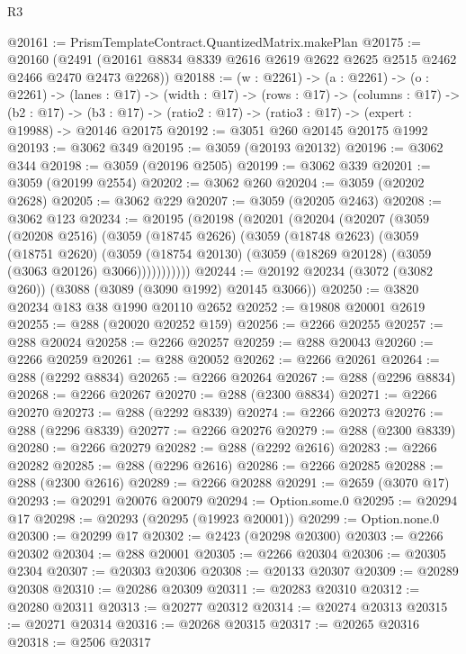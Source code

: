\begin{lexlean}{R3}
\begin{coremodule}
@20161 := PrismTemplateContract.QuantizedMatrix.makePlan
@20175 := @20160
    (@2491 (@20161 @8834 @8339 @2616 @2619 @2622 @2625 @2515 @2462 @2466 @2470 @2473 @2268))
@20188 := (w : @2261) ->
  (a : @2261) ->
  (o : @2261) ->
  (lanes : @17) ->
  (width : @17) ->
  (rows : @17) ->
  (columns : @17) ->
  (b2 : @17) -> (b3 : @17) -> (ratio2 : @17) -> (ratio3 : @17) -> (expert : @19988) -> @20146 @20175
@20192 := @3051 @260 @20145 @20175 @1992
@20193 := @3062 @349
@20195 := @3059 (@20193 @20132)
@20196 := @3062 @344
@20198 := @3059 (@20196 @2505)
@20199 := @3062 @339
@20201 := @3059 (@20199 @2554)
@20202 := @3062 @260
@20204 := @3059 (@20202 @2628)
@20205 := @3062 @229
@20207 := @3059 (@20205 @2463)
@20208 := @3062 @123
@20234 := @20195
    (@20198
      (@20201
        (@20204
          (@20207
            (@3059
              (@20208 @2516)
              (@3059
                (@18745 @2626)
                (@3059
                  (@18748 @2623)
                  (@3059
                    (@18751 @2620)
                    (@3059
                      (@18754 @20130)
                      (@3059 (@18269 @20128) (@3059 (@3063 @20126) @3066)))))))))))
@20244 := @20192 @20234 (@3072 (@3082 @260)) (@3088 (@3089 (@3090 @1992) @20145 @3066))
@20250 := @3820 @20234 @183 @38 @1990 @20110 @2652
@20252 := @19808 @20001 @2619
@20255 := @288 (@20020 @20252 @159)
@20256 := @2266 @20255
@20257 := @288 @20024
@20258 := @2266 @20257
@20259 := @288 @20043
@20260 := @2266 @20259
@20261 := @288 @20052
@20262 := @2266 @20261
@20264 := @288 (@2292 @8834)
@20265 := @2266 @20264
@20267 := @288 (@2296 @8834)
@20268 := @2266 @20267
@20270 := @288 (@2300 @8834)
@20271 := @2266 @20270
@20273 := @288 (@2292 @8339)
@20274 := @2266 @20273
@20276 := @288 (@2296 @8339)
@20277 := @2266 @20276
@20279 := @288 (@2300 @8339)
@20280 := @2266 @20279
@20282 := @288 (@2292 @2616)
@20283 := @2266 @20282
@20285 := @288 (@2296 @2616)
@20286 := @2266 @20285
@20288 := @288 (@2300 @2616)
@20289 := @2266 @20288
@20291 := @2659 (@3070 @17)
@20293 := @20291 @20076 @20079
@20294 := Option.some.{0}
@20295 := @20294 @17
@20298 := @20293 (@20295 (@19923 @20001))
@20299 := Option.none.{0}
@20300 := @20299 @17
@20302 := @2423 (@20298 @20300)
@20303 := @2266 @20302
@20304 := @288 @20001
@20305 := @2266 @20304
@20306 := @20305 @2304
@20307 := @20303 @20306
@20308 := @20133 @20307
@20309 := @20289 @20308
@20310 := @20286 @20309
@20311 := @20283 @20310
@20312 := @20280 @20311
@20313 := @20277 @20312
@20314 := @20274 @20313
@20315 := @20271 @20314
@20316 := @20268 @20315
@20317 := @20265 @20316
@20318 := @2506 @20317

\end{coremodule}
\end{lexlean}
